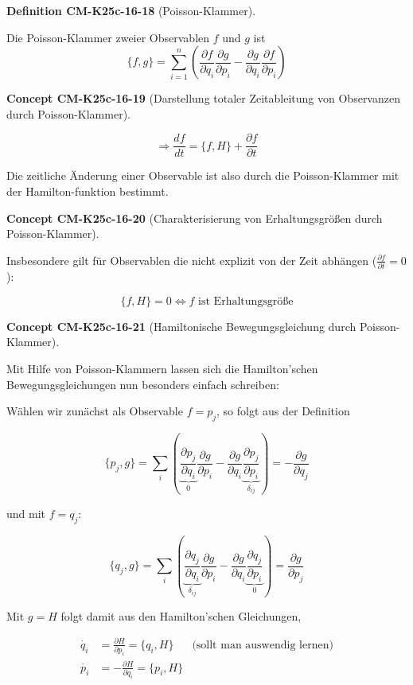 \documentclass[10pt, letterpaper]{article}
\newcommand{\CustomHeading}[3]{%
  \par\medskip\noindent%
  \textbf{#1 #2} \textnormal{(#3)}.\enskip%
}
\newenvironment{DEF}[2]{\begin{unitbox}\CustomHeading{Definition}{#1}{#2}}{\end{unitbox}}
\newenvironment{CONC}[2]{\begin{unitbox}\CustomHeading{Concept}{#1}{#2}}{\end{unitbox}}
\begin{document}
\begin{DEF}{CM-K25c-16-18}{Poisson-Klammer}
Die Poisson-Klammer zweier Observablen $f$ und $g$ ist
\[\{f,g\} = \sum_{i=1}^n \left(\frac{\partial f}{\partial q_i}\frac{\partial g}{\partial p_i} - \frac{\partial g}{\partial q_i}\frac{\partial f}{\partial p_i}\right)\]
\end{DEF}


\begin{CONC}{CM-K25c-16-19}{Darstellung totaler Zeitableitung von Observanzen durch Poisson-Klammer}
\[\Rightarrow \frac{df}{dt} = \{f,H\} + \frac{\partial f}{\partial t}\]

Die zeitliche Änderung einer Observable ist also durch die Poisson-Klammer mit der Hamilton-funktion bestimmt.
\end{CONC}

\begin{CONC}{CM-K25c-16-20}{Charakterisierung von Erhaltungsgrößen durch Poisson-Klammer}
Insbesondere gilt für Observablen die nicht explizit von der Zeit abhängen ($\frac{\partial f}{\partial t} = 0$):

\[\{f,H\} = 0 \Leftrightarrow f \text{ ist Erhaltungsgröße}\]
\end{CONC}


\begin{CONC}{CM-K25c-16-21}{Hamiltonische Bewegungsgleichung durch Poisson-Klammer}
Mit Hilfe von Poisson-Klammern lassen sich die Hamilton'schen Bewegungsgleichungen nun besonders einfach schreiben:

Wählen wir zunächst als Observable $f = p_j$, so folgt aus der Definition

\[\{p_j,g\} = \sum_i \left(\underbrace{\frac{\partial p_j}{\partial q_i}}_{0}\frac{\partial g}{\partial p_i} - \frac{\partial g}{\partial q_i}\underbrace{\frac{\partial p_j}{\partial p_i}}_{\delta_{ij}}\right) = -\frac{\partial g}{\partial q_j}\]

und mit $f = q_j$:

\[\{q_j,g\} = \sum_i \left(\underbrace{\frac{\partial q_j}{\partial q_i}}_{\delta_{ij}}\frac{\partial g}{\partial p_i} - \frac{\partial g}{\partial q_i}\underbrace{\frac{\partial q_j}{\partial p_i}}_{0}\right) = \frac{\partial g}{\partial p_j}\]

Mit $g = H$ folgt damit aus den Hamilton'schen Gleichungen,

\[\boxed{\begin{aligned}
\dot{q_i} &= \frac{\partial H}{\partial p_i} = \{q_i,H\} & \text{(sollt man auswendig lernen)} \\
\dot{p_i} &= -\frac{\partial H}{\partial q_i} = \{p_i,H\}
\end{aligned}}\]
\end{CONC}
\end{document}
